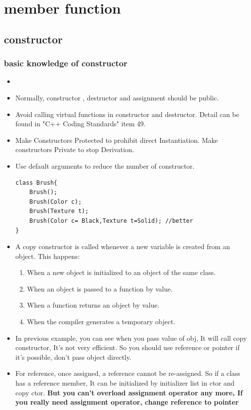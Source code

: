 \documentclass[a4paper,11pt,twoside]{book}
\begin{document}
\section{member function}


\subsection{constructor}
\subsubsection{basic knowledge of constructor}

\begin{itemize}
	\item \item Normally, constructor , destructor and assignment should be public. 
	
	\item Avoid calling virtual functions in constructor and destructor. Detail can be found in "C++ Coding Standards" item 49.
	
	\item Make Constructors Protected to prohibit direct Instantiation. Make constructors Private to stop Derivation.
	
	\item Use default arguments to reduce the number of constructor.
\begin{lstlisting}[numbers=none]
class Brush{
	Brush();
	Brush(Color c);
	Brush(Texture t);
	Brush(Color c= Black,Texture t=Solid); //better
}
\end{lstlisting}
		
		\item A copy constructor is called whenever a new variable is created from an object. This happens:
		
		\begin{enumerate}
			\item When a new object is initialized to an object of the same class.
			\item When an object is passed to a function by value.
			\item When a function returns an object by value.
			\item When the compiler generates a temporary object.
		\end{enumerate}
		
		\item In previous example, you can see when you pass value of obj, It will call copy constructor, It's not very efficient. So you should use reference or pointer if it's possible, don't pass object directly.
		
		\item For reference, once assigned, a reference cannot be re-assigned. So if a class has a reference member, It can be initialized by initializer list in ctor and copy ctor. \textbf{But you can't overload assignment operator any more, If you really need assignment operator, change reference to pointer}
		
\end{itemize}
\end{document}
